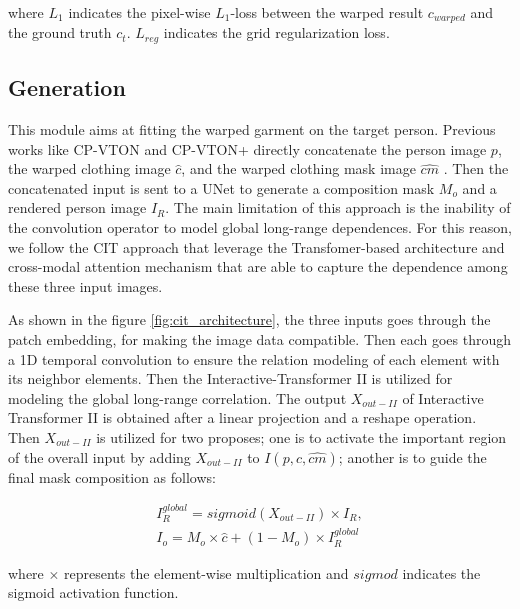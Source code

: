 where $L_1$ indicates the pixel-wise $L_1$-loss between the warped result $c_{warped}$ and the ground truth $c_t$. $L_{reg}$ indicates the grid regularization loss.


\subsection{Generation}

This module aims at fitting the warped garment on the target person. Previous works like CP-VTON and CP-VTON+ directly concatenate the person image $p$, the warped clothing image
$\hat{c}$, and the warped clothing mask image $\hat{cm}$ . Then the concatenated input is sent to a UNet \cite{u-net} to generate a composition mask $M_o$ and a rendered person image $I_R$. The main limitation of this approach is the inability of the convolution operator to model global long-range dependences. For this reason, we follow the CIT \cite{CIT} approach that leverage the Transfomer-based architecture and cross-modal attention mechanism that are able to capture the dependence among these three input images.

As shown in the figure \ref{fig:cit_architecture}, the three inputs goes through the patch embedding, for making the image data compatible.  Then each goes through a 1D temporal convolution to ensure the relation modeling of each element with its neighbor elements. Then the Interactive-Transformer II is utilized for modeling the global long-range correlation. The output $X_{out-II}$ of Interactive Transformer II is obtained after a linear projection and a reshape operation. Then $X_{out-II}$ is utilized for two proposes; one is to activate the important region of the overall input by adding $X_{out-II}$ to $I(p,\hat{c},\hat{cm})$; another is to guide the final mask composition as follows:

\begin{equation}
  \begin{aligned}
    I_{R}^{global} = sigmoid(X_{out-II}) \times I_R, \\
I_o = M_o \times \hat{c} + (1 - M_o) \times I_{R}^{global}
  \end{aligned}
\end{equation}

where $\times$ represents the element-wise multiplication and $sigmod$ indicates the sigmoid activation function.

